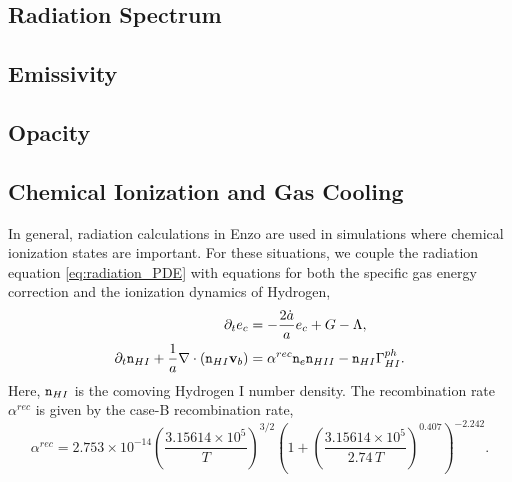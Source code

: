 \documentclass[letterpaper,10pt]{article}
\renewcommand{\(}{\left(}
\renewcommand{\)}{\right)}
\newcommand{\vb}{{\bf v}_b}
\newcommand{\mn}{{\tt n}}
\begin{document}
\subsection{Radiation Spectrum}
\label{sec:AMRFLDSplit_spectrum}



\subsection{Emissivity}
\label{sec:AMRFLDSplit_emissivity}



\subsection{Opacity}
\label{sec:AMRFLDSplit_opacity}



\subsection{Chemical Ionization and Gas Cooling}
\label{sec:AMRFLDSplit_chemistry}

In general, radiation calculations in Enzo are used in simulations
where chemical ionization states are important.  For these situations, 
we couple the radiation equation \eqref{eq:radiation_PDE} with
equations for both the specific gas energy correction and the
ionization dynamics of Hydrogen,
\begin{align}
  \notag
  \partial_t e_c &= -\frac{2\dot{a}}{a}e_c + G - \Lambda, \\
  \label{eq:hydrogen_ionization}
  \partial_t \mn_{HI} + \frac{1}{a}\nabla\cdot\(\mn_{HI}\vb\) &=
    \alpha^{rec} \mn_e \mn_{HII} - \mn_{HI} \Gamma_{HI}^{ph}. 
\end{align}
Here, $\mn_{HI}$ is the comoving Hydrogen I number density.  The
recombination rate $\alpha^{rec}$ is given by the case-B
recombination rate, 
\begin{equation}
\label{eq:alphaB}
\alpha^{rec} = 2.753\times 10^{-14} \left(\frac{3.15614\times 10^5}{T}\right)^{3/2} 
                   \left(1+\left(\frac{3.15614\times 10^5}{2.74\, T}\right)^{0.407}\right)^{-2.242}.
\end{equation}
\end{document}
